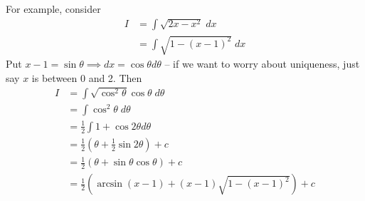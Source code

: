 \documentclass{../../template/note}
\begin{document}
\begin{itemize}
        For example, consider
        \begin{align*}
            I &= \int \sqrt{2x - x^2} \; dx \\
            &= \int \sqrt{1 - (x-1)^2} \; dx
        \end{align*}
        Put \(x-1 = \sin \theta \implies dx = \cos \theta d\theta\) -- if we want to worry about uniqueness, just say \(x\) is between 0 and 2. Then
        \begin{align*}
            I &= \int \sqrt{\cos^2 \theta} \cos \theta \; d \theta \\
            &= \int \cos^2 \theta \; d \theta \\
            &= \frac{1}{2} \int 1 + \cos 2 \theta d \theta \\
            &= \frac{1}{2} (\theta + \frac 1 2 \sin 2 \theta) + c \\
            &= \frac{1}{2} (\theta + \sin \theta \cos \theta) + c \\
            &= \frac{1}{2} \left(\arcsin(x-1) + (x-1)\sqrt{1-(x-1)^2}\right) + c
        \end{align*}
        
    \end{itemize}
    
\end{document}
